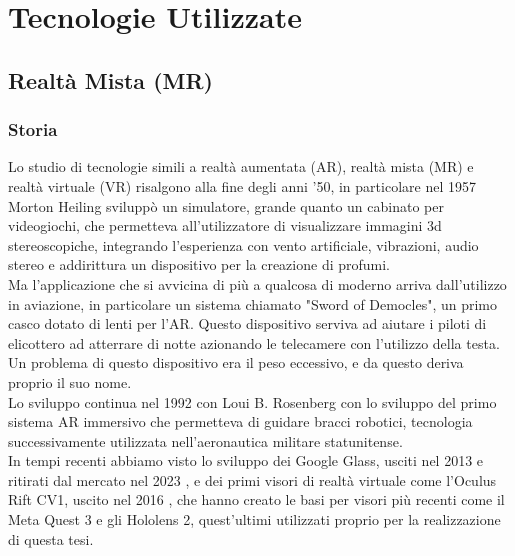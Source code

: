 \chapter{Tecnologie Utilizzate}
\pagestyle{plain}


\section{Realtà Mista (MR)}

\subsection{Storia}
Lo studio di tecnologie simili a realtà aumentata (AR), realtà mista (MR) e realtà virtuale (VR) risalgono alla fine degli anni '50, in particolare nel 1957 Morton Heiling sviluppò un simulatore, grande quanto un cabinato per videogiochi, che permetteva all'utilizzatore di visualizzare immagini 3d stereoscopiche, integrando l'esperienza con vento artificiale, vibrazioni, audio stereo e addirittura un dispositivo per la creazione di profumi.\\Ma l'applicazione che si avvicina di più a qualcosa di moderno arriva dall'utilizzo in aviazione, in particolare un sistema chiamato "Sword of Democles", un primo casco dotato di lenti per l'AR. Questo dispositivo serviva ad aiutare i piloti di elicottero ad atterrare di notte azionando le telecamere con l'utilizzo della testa. Un problema di questo dispositivo era il peso eccessivo, e da questo deriva proprio il suo nome. \\ Lo sviluppo continua nel 1992 con Loui B. Rosenberg con lo sviluppo del primo sistema AR immersivo che permetteva di guidare bracci robotici, tecnologia successivamente utilizzata nell'aeronautica militare statunitense. \cite{OverviewofAugmentedReality}
\\ In tempi recenti abbiamo visto lo sviluppo dei Google Glass, usciti nel 2013 e ritirati dal mercato nel 2023 \cite{EndofGoogleGlass}, e dei primi visori di realtà virtuale come l'Oculus Rift CV1, uscito nel 2016 \cite{OculusRift1}, che hanno creato le basi per visori più recenti come il Meta Quest 3 e gli Hololens 2, quest'ultimi utilizzati proprio per la realizzazione di questa tesi.

